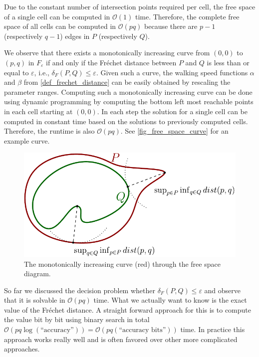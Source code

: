 \documentclass[
oneside,
fontsize=11pt
]{scrartcl}
\begin{document}
Due to the constant number of intersection points required per cell, 
the free space of a single cell can be computed in $\mathcal{O}(1)$ time.
Therefore, the complete free space of all cells can be computed in $\mathcal{O}(pq)$
because there are $p-1$ (respectively $q-1$) edges in $P$ (respectively $Q$).

We observe that there exists 
a monotonically increasing curve from $(0,0)$ to $(p,q)$ in $F_\varepsilon$
if and only if the Fréchet distance between $P$ and $Q$ is less than or equal to $\varepsilon$,
i.e., $\delta_F(P,Q) \leq \varepsilon$.
Given such a curve, the walking speed functions $\alpha$ and $\beta$ from \autoref{def_frechet_distance}
can be easily obtained by rescaling the parameter ranges. 
Computing such a monotonically increasing curve can be done using dynamic programming 
by computing the bottom left most reachable points in each cell starting at $(0,0)$. 
In each step the solution for a single cell can be computed in constant time based on the 
solutions to previously computed cells. 
Therefore, the runtime is also $\mathcal{O}(pq)$. 
See \autoref{fig_free_space_curve} for an example curve. \cite{alt_computing_1995}

\begin{figure}[ht]
  \centering
  \includegraphics[width=\textwidth]{images/hausdorff/hausdorff-distance-example.pdf}
  \caption{The monotonically increasing curve (red) through the free space diagram.}
  \label{fig_free_space_curve}
\end{figure}

So far we discussed the decision problem whether $\delta_{F}(P,Q) \leq \varepsilon$
and observe that it is solvable in $\mathcal{O}(pq)$ time.
What we actually want to know is the exact value of the Fréchet distance.
A straight forward approach for this is to compute the value bit by bit 
using binary search in total $\mathcal{O}(pq \log (\text{``accuracy''})) = \mathcal{O}(pq  (\text{``accuracy bits''}))$ time.
In practice this approach works really well 
and is often favored over other more complicated approaches. \cite{alt_computing_1995} 
\end{document}
